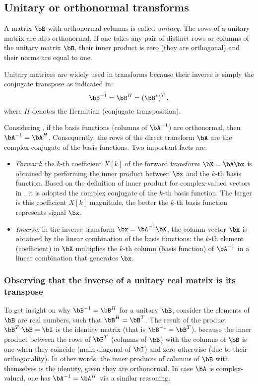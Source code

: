 \subsection{{\akadvanced} Unitary or orthonormal transforms}
\label{sec:unitary_transforms}

A matrix $\bB$ with orthonormal columns is called \emph{unitary}. The rows of a unitary matrix are also orthonormal. If one takes any pair of distinct rows or columns of the unitary matrix $\bB$, their inner product is zero (they are orthogonal) and their norms are equal to one.

Unitary matrices are widely used in transforms because their inverse is 
simply the conjugate transpose as indicated in:
\[
\bB^{-1} = \bB^H = \left(\bB^{*}\right)^T,
\]
where $H$ denotes the Hermitian (conjugate transposition).

Considering , if the basis functions (columns of $\bA^{-1}$) are orthonormal, then $\bA^{-1} = \bA^H$. Consequently, the rows of the direct transform $\bA$ are the complex-conjugate of the basis functions.
Two important facts are:
\begin{itemize}
	\item \emph{Forward}: the $k$-th coefficient $X[k]$ of the forward transform $\bX = \bA \bx$ is obtained by performing the inner product between $\bx$ and the $k$-th basis function. Based on the definition of inner product for complex-valued vectors in , it is adopted the complex conjugate of the $k$-th basis function. The larger is this coefficient $X[k]$  magnitude, the better the $k$-th basis function represents signal $\bx$.
	\item \emph{Inverse}: in the inverse transform $\bx = \bA^{-1} \bX$, the column vector $\bx$ is obtained by the linear combination of the basis functions: the $k$-th element (coefficient) in $\bX$ multiplies the $k$-th column (basis function) of $\bA^{-1}$ in a linear combination that generates $\bx$.
\end{itemize}

\subsubsection{Observing that the inverse of a unitary real matrix is its transpose}
To get insight on why $\bB^{-1} = \bB^H$ for a unitary $\bB$, consider the elements of $\bB$ are real numbers, such that $\bB^H = \bB^T$. The result of the product $\bB^T~\bB = \bI$ is the identity matrix (that is $\bB^{-1} = \bB^T$), because the inner product between the rows of $\bB^T$ (columns of $\bB$) with the columns of $\bB$ is one when they coincide (main diagonal of $\bI$) and zero otherwise (due to their orthogonality). In other words, the inner products of columns of $\bB$ with themselves is the identity, given they are orthonormal. In case $\bA$ is complex-valued, one has $\bA^{-1} = \bA^H$ via a similar reasoning.

